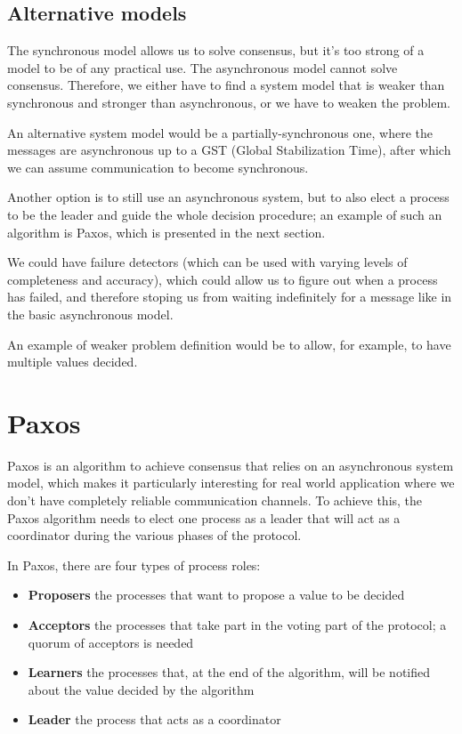\subsection{Alternative models}\label{sec:Alternative models}
The synchronous model allows us to solve consensus, but it's too strong of a model to be of any practical use. The asynchronous model cannot solve consensus. Therefore, we either have to find a system model that is weaker than synchronous and stronger than asynchronous, or we have to weaken the problem.

An alternative system model would be a partially-synchronous one, where the messages are asynchronous up to a GST (Global Stabilization Time), after which we can assume communication to become synchronous.

Another option is to still use an asynchronous system, but to also elect a process to be the leader and guide the whole decision procedure; an example of such an algorithm is Paxos, which is presented in the next section.

We could have failure detectors (which can be used with varying levels of completeness and accuracy), which could allow us to figure out when a process has failed, and therefore stoping us from waiting indefinitely for a message like in the basic asynchronous model.

An example of weaker problem definition would be to allow, for example, to have multiple values decided.

\section{Paxos}\label{sec:Paxos}
Paxos is an algorithm to achieve consensus that relies on an asynchronous system model, which makes it particularly interesting for real world application where we don't have completely reliable communication channels. To achieve this, the Paxos algorithm needs to elect one process as a leader that will act as a coordinator during the various phases of the protocol.

In Paxos, there are four types of process roles:
\begin{itemize}
  \item \textbf{Proposers} the processes that want to propose a value to be decided
  \item \textbf{Acceptors} the processes that take part in the voting part of the protocol; a quorum of acceptors is needed
  \item \textbf{Learners} the processes that, at the end of the algorithm, will be notified about the value decided by the algorithm
  \item \textbf{Leader} the process that acts as a coordinator
\end{itemize}

